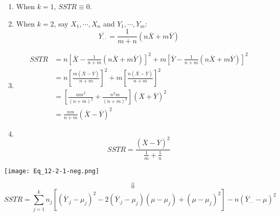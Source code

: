 \begin{frame}[fragile]
	\begin{enumerate}
		\item When $k=1$, $SSTR \equiv 0$.
			\vfill
		\item When $k=2$, say $X_1,\cdots,X_n$ and $Y_1,\cdots,Y_m$:
			\[
				\overline{Y_{\cdot\cdot}} = \frac{1}{m+n} \left(n\overline{X}+m\overline{Y} \right )
			\]
			\item[]
				\begin{align*}
					SSTR & = n \left[\overline{X}-\frac{1}{n+m}\left(n\overline{X}+m \overline{Y}\right)\right]^2	+ m \left[\overline{Y}-\frac{1}{n+m}\left(n\overline{X}+m \overline{Y}\right)\right]^2 \\
               & = n\left[\frac{m(\overline{X}-\overline{Y})}{n+m}\right]^2 + m\left[\frac{n(\overline{X}-\overline{Y})}{n+m}\right]^2 \\
							 & = \left[\frac{nm^2}{(n+m)^2}+\frac{n^2m}{(n+m)^2}\right]\left(\overline{X}+\overline{Y}\right)^2\\
							 & = \frac{nm}{n+m} \left(\overline{X}-\overline{Y}\right)^2
				\end{align*}
			\item[]
			\[\]
				\[
					SSTR = \frac{\left(\overline{X}-\overline{Y}\right)^2}{\displaystyle\frac 1m + \frac 1n}
				\]
	\end{enumerate}
\end{frame}
\begin{frame}[fragile]
	\begin{center}
		\texttt{[image: Eq\_12-2-1-neg.png]}
	\end{center}
	\[\Downarrow\]
	\[
		SSTR = \sum_{j=1}^k n_j\left[\left(\overline{Y}_{\cdot j}-\mu_j \right)^2 - 2 \left(\overline{Y}_{\cdot j}-\mu_j \right) \left(\mu-\mu_j \right)+ \left(\mu-\mu_j \right)^2\right ]	-n  \left(\overline{Y}_{\cdot \cdot}-\mu \right)^2
	\]
\end{frame}
